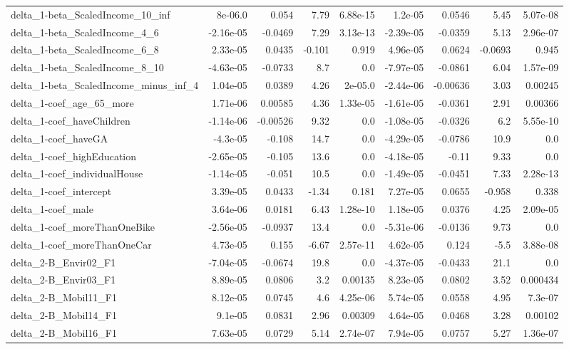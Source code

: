 \begin{tabular}{lrrrrrrrr}
delta_1-beta_ScaledIncome_10_inf & 8e-06.0 & 0.054 & 7.79 & 6.88e-15 & 1.2e-05 & 0.0546 & 5.45 & 5.07e-08 \\
delta_1-beta_ScaledIncome_4_6 & -2.16e-05 & -0.0469 & 7.29 & 3.13e-13 & -2.39e-05 & -0.0359 & 5.13 & 2.96e-07 \\
delta_1-beta_ScaledIncome_6_8 & 2.33e-05 & 0.0435 & -0.101 & 0.919 & 4.96e-05 & 0.0624 & -0.0693 & 0.945 \\
delta_1-beta_ScaledIncome_8_10 & -4.63e-05 & -0.0733 & 8.7 & 0.0 & -7.97e-05 & -0.0861 & 6.04 & 1.57e-09 \\
delta_1-beta_ScaledIncome_minus_inf_4 & 1.04e-05 & 0.0389 & 4.26 & 2e-05.0 & -2.44e-06 & -0.00636 & 3.03 & 0.00245 \\
delta_1-coef_age_65_more & 1.71e-06 & 0.00585 & 4.36 & 1.33e-05 & -1.61e-05 & -0.0361 & 2.91 & 0.00366 \\
delta_1-coef_haveChildren & -1.14e-06 & -0.00526 & 9.32 & 0.0 & -1.08e-05 & -0.0326 & 6.2 & 5.55e-10 \\
delta_1-coef_haveGA & -4.3e-05 & -0.108 & 14.7 & 0.0 & -4.29e-05 & -0.0786 & 10.9 & 0.0 \\
delta_1-coef_highEducation & -2.65e-05 & -0.105 & 13.6 & 0.0 & -4.18e-05 & -0.11 & 9.33 & 0.0 \\
delta_1-coef_individualHouse & -1.14e-05 & -0.051 & 10.5 & 0.0 & -1.49e-05 & -0.0451 & 7.33 & 2.28e-13 \\
delta_1-coef_intercept & 3.39e-05 & 0.0433 & -1.34 & 0.181 & 7.27e-05 & 0.0655 & -0.958 & 0.338 \\
delta_1-coef_male & 3.64e-06 & 0.0181 & 6.43 & 1.28e-10 & 1.18e-05 & 0.0376 & 4.25 & 2.09e-05 \\
delta_1-coef_moreThanOneBike & -2.56e-05 & -0.0937 & 13.4 & 0.0 & -5.31e-06 & -0.0136 & 9.73 & 0.0 \\
delta_1-coef_moreThanOneCar & 4.73e-05 & 0.155 & -6.67 & 2.57e-11 & 4.62e-05 & 0.124 & -5.5 & 3.88e-08 \\
delta_2-B_Envir02_F1 & -7.04e-05 & -0.0674 & 19.8 & 0.0 & -4.37e-05 & -0.0433 & 21.1 & 0.0 \\
delta_2-B_Envir03_F1 & 8.89e-05 & 0.0806 & 3.2 & 0.00135 & 8.23e-05 & 0.0802 & 3.52 & 0.000434 \\
delta_2-B_Mobil11_F1 & 8.12e-05 & 0.0745 & 4.6 & 4.25e-06 & 5.74e-05 & 0.0558 & 4.95 & 7.3e-07 \\
delta_2-B_Mobil14_F1 & 9.1e-05 & 0.0831 & 2.96 & 0.00309 & 4.64e-05 & 0.0468 & 3.28 & 0.00102 \\
delta_2-B_Mobil16_F1 & 7.63e-05 & 0.0729 & 5.14 & 2.74e-07 & 7.94e-05 & 0.0757 & 5.27 & 1.36e-07 \\

\end{tabular}
